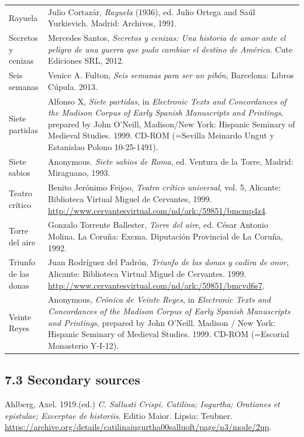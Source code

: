 \begin{flushleft}
\begin{supertabular}{m{1.7955599in}m{4.42126in}}
Rayuela  &
Julio Cortazár, \textit{Rayuela }(1936), ed. Julio Ortega and Saúl Yurkievich. Madrid: Archivos, 1991.\\
Secretos y cenizas  &
Mercedes Santos, \textit{Secretos y cenizas: Una historia de amor ante el peligro de una guerra que pudo cambiar el destino de América.} Cute Ediciones SRL, 2012.\\
Seis semanas\textit{ } &
Venice A.\textit{ }Fulton, \textit{Seis semanas para ser un pibón}, Barcelona: Libros Cúpula. 2013.\\
Siete partidas  &
Alfonso X, \textit{Siete partidas}, in \textit{Electronic Texts and Concordances of the Madison Corpus of Early Spanish Manuscripts and Printings},\textit{ }prepared by John O’Neill, Madison/New York: Hispanic Seminary of Medieval Studies. 1999. CD-ROM (=Sevilla Meinardo Ungut y Estanislao Polono 10-25-1491)\textit{.}\\
Siete sabios &
Anonymous. \textit{Siete sabios de Roma}, ed. Ventura de la Torre, Madrid: Miraguano, 1993.\\
Teatro crítico\textit{ } &
Benito Jerónimo Feijoo, \textit{Teatro crítico universal}, vol. 5, Alicante: Biblioteca Virtual Miguel de Cervantes, 1999. \url{http://www.cervantesvirtual.com/nd/ark:/59851/bmcmp4z4}.\\
Torre del aire  &
Gonzalo Torrente Ballester, \textit{Torre del aire}, ed. César Antonio Molina. La Coruña: Excma. Diputación Provincial de La Coruña, 1992.\\
Triunfo de las donas  &
Juan Rodríguez del Padrón, \textit{Triunfo de las donas y cadira de onor}, Alicante: Biblioteca Virtual Miguel de Cervantes. 1999. \url{http://www.cervantesvirtual.com/nd/ark:/59851/bmcvd6s7}.\\
Veinte Reyes  &
Anonymous, \textit{Crónica de Veinte Reyes}, in \textit{Electronic Texts and Concordances of the Madison Corpus of Early Spanish Manuscripts and Printings}, prepared by John O’Neill. Madison / New York: Hispanic Seminary of Medieval Studies. 1999. CD-ROM (=Escorial Monasterio Y-I-12).\\
\end{supertabular}
\end{flushleft}
\subsection[7.3 Secondary sources]{7.3 Secondary sources}
\begin{styleStandard}
Ahlberg, Axel. 1919.(ed.) \textit{C. Sallusti Crispi. Catilina; Iugurtha; Orationes et epistulae; Excerptae de historiis}. Editio Maior. Lipsia: Teubner. \url{https://archive.org/details/catilinaiugurtha00salluoft/page/n3/mode/2up}.
\end{styleStandard}

